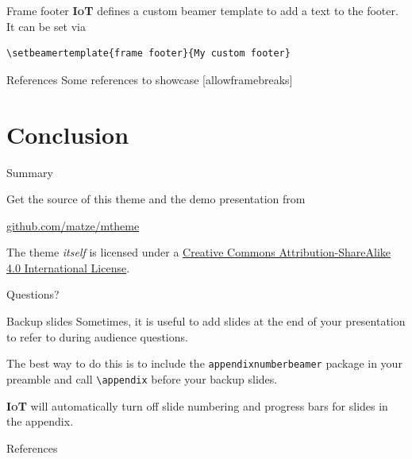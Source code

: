 \documentclass[10pt]{beamer}
\newcommand{\themename}{\textbf{\textsc{IoT}}\xspace}
\begin{document}
{%
\begin{frame}[fragile]{Frame footer}
    \themename defines a custom beamer template to add a text to the footer. It can be set via
    \begin{verbatim}\setbeamertemplate{frame footer}{My custom footer}\end{verbatim}
\end{frame}
}

\begin{frame}{References}
  Some references to showcase [allowframebreaks] \cite{knuth92,ConcreteMath,Simpson,Er01,greenwade93}
\end{frame}

\section{Conclusion}

\begin{frame}{Summary}

  Get the source of this theme and the demo presentation from

  \begin{center}\url{github.com/matze/mtheme}\end{center}

  The theme \emph{itself} is licensed under a
  \href{http://creativecommons.org/licenses/by-sa/4.0/}{Creative Commons
  Attribution-ShareAlike 4.0 International License}.

  \begin{center}\ccbysa\end{center}

\end{frame}

\begin{frame}[standout]
  Questions?
\end{frame}

\appendix

\begin{frame}[fragile]{Backup slides}
  Sometimes, it is useful to add slides at the end of your presentation to
  refer to during audience questions.

  The best way to do this is to include the \verb|appendixnumberbeamer|
  package in your preamble and call \verb|\appendix| before your backup slides.

  \themename will automatically turn off slide numbering and progress bars for
  slides in the appendix.
\end{frame}

\begin{frame}[allowframebreaks]{References}

  
  

\end{frame}
\end{document}
